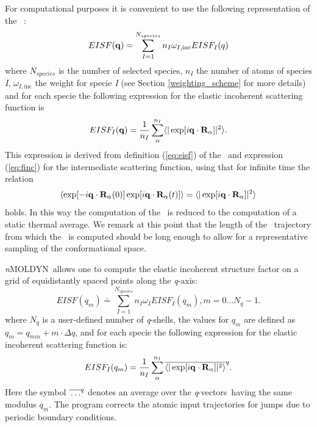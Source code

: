 \documentclass[a4paper,11pt]{report}
\newcommand{\qval}{\textit{q}}
\newcommand{\qvects}{\textit{q}-vectors}
\newcommand{\qshells}{\textit{q}-shells}
\newcommand{\NMOLDYN}{\textit{n}MOLDYN}
\begin{document}
For computational purposes it is convenient to use the following representation of the \EISF\ \cite{Smith:1992}:
\begin{equation}
\label{eq:eisf_compute}
EISF({\bf q}) = \sum^{N_{species}}_{I = 1} n_I \omega_{I,\mathrm{inc}} EISF_I(q)
\end{equation}
where $N_{species}$ is the number of selected species, $n_I$ the number of atoms of species \textit{I}, $\omega_{I,\mathrm{inc}}$ the weight for 
specie \textit{I} (see Section \ref{weighting_scheme} for more details) and for each specie the following expression for the elastic 
incoherent scattering function is
\begin{equation}
\label{eisf_rho}
EISF_I({\bf q}) = \frac{1}{n_I}\sum^{n_I}_{\alpha}  \langle|\exp[i{\bf q}\cdot{\bf R}_\alpha]|^2\rangle.
\end{equation}
This expression is derived from definition (\ref{eq:eisf}) of the \EISF\ and expression (\ref{eq:finc}) for the intermediate 
scattering function, using that for infinite time the relation
\begin{equation}
\langle\exp[-i{\bf q}\cdot{\bf R}_\alpha(0)]
\exp[i{\bf q}\cdot{\bf R}_\alpha(t)]\rangle =
\langle|\exp[i{\bf q}\cdot{\bf R}_\alpha]|^2 \rangle 
\end{equation}
holds. In this way the computation of the \EISF\ is reduced to the computation of a static thermal average. We remark at this 
point that the length of the \MD\ trajectory from which the \EISF\ is computed should be long enough to allow for a representative 
sampling of the conformational space.

\NMOLDYN\ allows one to compute the elastic incoherent structure factor on a grid of equidistantly spaced points along the
\qval-axis:
\begin{equation}
EISF(q_m) \doteq \sum^{N_{species}}_{I = 1} n_I \omega_I EISF_I(q_m), m = 0\ldots N_q - 1.
\end{equation}
where $N_q$ is a user-defined number of \qshells, the values for $q_m$ are defined as $q_m = q_{min} + m\cdot\Delta q$, 
and for each specie the following expression for the elastic incoherent scattering function is:
\begin{equation}
\label{eq:eisf_q_average}
EISF_I(q_m) = \frac{1}{n_I}\sum^{n_I}_{\alpha} \overline{ \langle|\exp[i{\bf q}\cdot{\bf R}_\alpha]|^2\rangle}^q.
\end{equation}
Here the symbol $\overline{\rule{0pt}{5pt}\ldots}^{q}$ denotes an average over the \qvects\ having the same modulus
$q_m$. The program corrects the atomic input trajectories for jumps due to periodic boundary conditions. 
\end{document}
